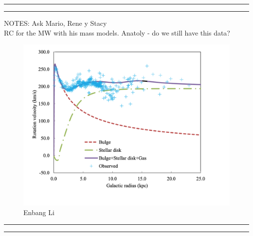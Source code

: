 \documentclass[reprint,%
 amsmath,amssymb,
 aps,
]{revtex4-1}
\begin{document}
  {\color{teal} \rule{\linewidth}{0.5mm}}
{\color{teal} \rule{\linewidth}{0.5mm}}
NOTES:  Ask Mario,  Rene y Stacy  \\

  RC for the MW with his mass models. 
 Anatoly - do we still have this data?
  \begin{figure}
    \centering
    \includegraphics{MW_Enbang_Li}
    \caption{Enbang Li \cite{Li2016ModellingMD}}
    \label{fig:my_label}
\end{figure}

{\color{teal} \rule{\linewidth}{0.5mm}}

 {\color{red} \rule{\linewidth}{0.5mm}}
  
   
\end{document}
